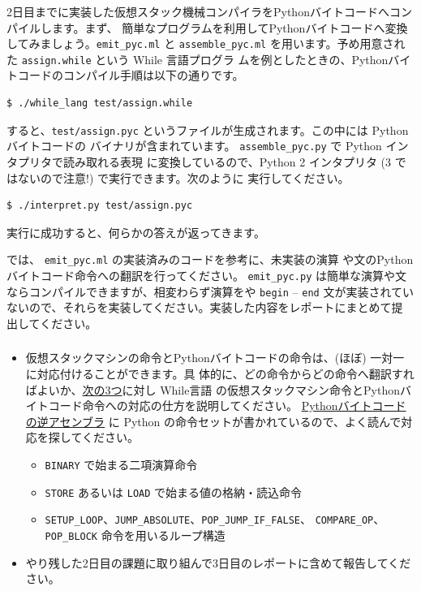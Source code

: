 \documentclass[a4paper,11pt]{jsarticle}
\begin{document}
\subsubsection{}

2日目までに実装した仮想スタック機械コンパイラをPythonバイトコードへコンパイルします。まず、
簡単なプログラムを利用してPythonバイトコードへ変換してみましょう。\verb|emit_pyc.ml| と
\verb|assemble_pyc.ml| を用います。予め用意された \verb|assign.while| という While 言語プログラ
ムを例としたときの、Pythonバイトコードのコンパイル手順は以下の通りです。

\begin{lstlisting}
$ ./while_lang test/assign.while
\end{lstlisting}

すると、\verb|test/assign.pyc| というファイルが生成されます。この中には Pythonバイトコードの
バイナリが含まれています。 \verb|assemble_pyc.py| で Python インタプリタで読み取れる表現
に変換しているので、Python 2 インタプリタ (3 ではないので注意!) で実行できます。次のように
実行してください。

\begin{lstlisting}
$ ./interpret.py test/assign.pyc
\end{lstlisting}

実行に成功すると、何らかの答えが返ってきます。

では、 \verb|emit_pyc.ml| の実装済みのコードを参考に、未実装の演算
や文のPythonバイトコード命令への翻訳を行ってください。
\verb|emit_pyc.py| は簡単な演算や文ならコンパイルできますが、相変わらず演算をや \verb|begin| --
\verb|end| 文が実装されていないので、それらを実装してください。実装した内容をレポートにまとめて提
出してください。

\subsubsection{}

\begin{itemize}
\item 仮想スタックマシンの命令とPythonバイトコードの命令は、(ほぼ) 一対一に対応付けることができます。具
  体的に、どの命令からどの命令へ翻訳すればよいか、\underline{次の3つ}に対し While言語
  の仮想スタックマシン命令とPythonバイトコード命令への対応の仕方を説明してください。
  \href{https://docs.python.org/ja/2.7/library/dis.html}{Pythonバイトコードの逆アセンブラ}
  に Python の命令セットが書かれているので、よく読んで対応を探してください。
  \begin{itemize}
  \item \verb|BINARY| で始まる二項演算命令
  \item \verb|STORE| あるいは \verb|LOAD| で始まる値の格納・読込命令
  \item \verb|SETUP_LOOP|、\verb|JUMP_ABSOLUTE|、\verb|POP_JUMP_IF_FALSE|、
    \verb|COMPARE_OP|、\verb|POP_BLOCK| 命令を用いるループ構造
  \end{itemize}
\item やり残した2日目の課題に取り組んで3日目のレポートに含めて報告してください。
\end{itemize}
\end{document}
